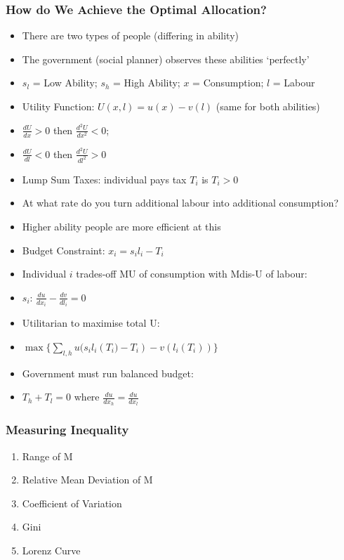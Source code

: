 \documentclass[11pt, english]{article}
\begin{document}
		\subsubsection{How do We Achieve the Optimal Allocation?}

	\begin{itemize}
	\setlength\itemsep{0cm}
		\item There are two types of people (differing in ability)
		\item The government (social planner) observes these abilities `perfectly'
		\item $s_l$ = Low Ability; $s_h$ = High Ability; $x$ = Consumption; $l$ = Labour
		\item Utility Function: $U(x,l)=u(x)-v(l)$ (same for both abilities)
		\item $\frac{dU}{dx}>0$ then $\frac{d^2U}{dx^2}<0$;
		\item $\frac{dU}{dl}<0$ then $\frac{d^2U}{dl^2}>0$
		\item Lump Sum Taxes: individual pays tax $T_i$ is $T_i>0$
		\item At what rate do you turn additional labour into additional consumption?
		\item Higher ability people are more efficient at this
		\item Budget Constraint: $x_i=s_il_i-T_i$
		\item Individual $i$ trades-off MU of consumption with Mdis-U of labour:
		\item $s_i$: $\frac{du}{dx_i}-\frac{dv}{dl_i}=0$
		\item Utilitarian to maximise total U:
		\item $\max\{\sum_{l,h}{u(s_il_i\left(T_i)-T_i\right)-v(l_i(T_i))}\}$
		\item Government must run balanced budget:
		\item $T_h+T_l=0$ where $\frac{du}{dx_h}=\frac{du}{dx_l}$
	\end{itemize}

		\subsubsection{Measuring Inequality}

	\begin{enumerate}
	\setlength\itemsep{0cm}
		\item Range of M
		\item Relative Mean Deviation of M
		\item Coefficient of Variation
		\item Gini
		\item Lorenz Curve
	\end{enumerate}
\end{document}
